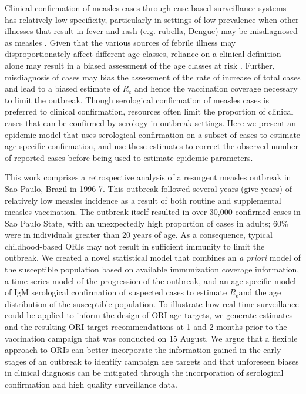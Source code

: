 Clinical confirmation of measles cases through case-based surveillance systems has relatively low specificity,
particularly in settings of low prevalence \cite{Hutchins_2004,Ho_2014,GUY_2004,31c964} when other illnesses that result in fever and
rash (e.g. rubella, Dengue) may be misdiagnosed as measles \cite{Ho_2014}. Given that the various sources of febrile illness may
disproportionately affect different age classes, reliance on a clinical
definition alone may result in a biased assessment of the age classes at
risk \cite{Hutchins_2004,Durrheim_2014}. Further, misdiagnosis of
cases may bias the assessment of the rate of increase of total cases and
lead to a biased estimate of \(R_{e}\) and hence the vaccination
coverage necessary to limit the outbreak. Though serological
confirmation of measles cases is preferred to clinical confirmation,
resources often limit the proportion of clinical cases that can be
confirmed by serology in outbreak settings. Here we present an epidemic
model that uses serological confirmation on a subset of cases to estimate age-specific confirmation, and use these estimates to correct the observed number of reported cases before being used to estimate epidemic parameters.

This work comprises a retrospective analysis of a resurgent measles outbreak in
Sao Paulo, Brazil in 1996-7. This outbreak followed several years (give years) of
relatively low measles incidence as a result of both routine and
supplemental measles vaccination. The outbreak itself resulted in over
30,000 confirmed cases in Sao Paulo State, with an unexpectedly high
proportion of cases in adults; 60\% were in individuals greater than 20
years of age. As a consequence, typical childhood-based ORIs may not result in sufficient immunity to limit the outbreak. We
created a novel statistical model that combines an \emph{a priori} model
of the susceptible population based on available immunization coverage information, a time series model of the progression of
the outbreak, and an age-specific model of IgM serological confirmation
of suspected cases to estimate \(R_{e}\)and the age distribution of the
susceptible population. To illustrate how real-time surveillance could
be applied to inform the design of ORI age targets, we generate
estimates and the resulting ORI target recommendations at 1
and 2 months prior to the vaccination campaign that was
conducted on 15 August. We argue that a flexible approach to ORIs can
better incorporate the information gained in the early stages of an
outbreak to identify campaign age targets and that unforeseen biases in
clinical diagnosis can be mitigated through the incorporation of
serological confirmation and high quality surveillance data.